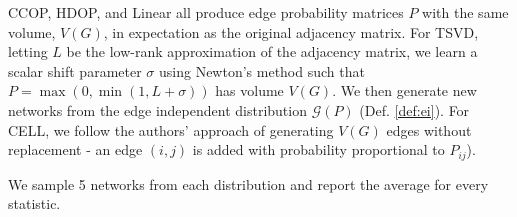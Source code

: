 CCOP, HDOP, and Linear all produce edge probability matrices $P$ with the same volume, $V(G)$, in expectation as the original adjacency matrix. For TSVD, letting $L$ be the low-rank approximation of the adjacency matrix, we learn a scalar shift parameter $\sigma$ using Newton's method
such that $P = \max(0,\min(1,L+\sigma))$ has volume $V(G)$.
We then generate new networks from the edge independent distribution $\mathcal{G}(P)$ (Def. \ref{def:ei}). %
For CELL, we follow the authors' approach of generating $V(G)$ edges without replacement - an edge $(i,j)$ is added with probability proportional to $P_{ij}$).

We sample 5 networks from each distribution and report the average for every statistic.

  
